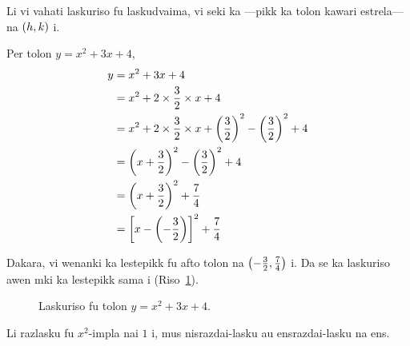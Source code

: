 Li vi vahati laskuriso fu laskudvaima, vi seki ka ---pikk
ka tolon kawari estrela---na \(\left(h, k\right)\) i.

\begin{example}
  Per tolon \(y = x^2 + 3x + 4\),
  \begin{align*}
    y &= x^2 + 3x + 4 \\
    &= x^2 + 2 \times \frac{3}{2} \times x + 4\\
    &= x^2 + 2 \times \frac{3}{2} \times x + {\left(\frac{3}{2}\right)}^2 - {\left(\frac{3}{2}\right)}^2 + 4\\
    &= {\left(x + \frac{3}{2}\right)}^2 - {\left(\frac{3}{2}\right)}^2 + 4 \\
    &= {\left(x + \frac{3}{2}\right)}^2 + \frac{7}{4} \\
    &= {\left[x - \left(- \frac{3}{2}\right)\right]}^2 + \frac{7}{4}
  \end{align*}

  Dakara, vi wenanki ka lestepikk fu afto tolon na \(\left(-\frac{3}{2}, \frac{7}{4}\right)\) i. Da se ka
  laskuriso awen mki ka lestepikk sama i (Riso~\ref{fig:3274tolon}).
  

\end{example}

  \begin{figure}[htpb]
    \centering
    \caption{Laskuriso fu tolon \(y = x^2 + 3x + 4\).}
    \label{fig:3274tolon}
  \end{figure}

Li razlasku fu \(x^2\)-impla nai \(1\) i, mus  nisrazdai-lasku au ensrazdai-lasku na ens.

